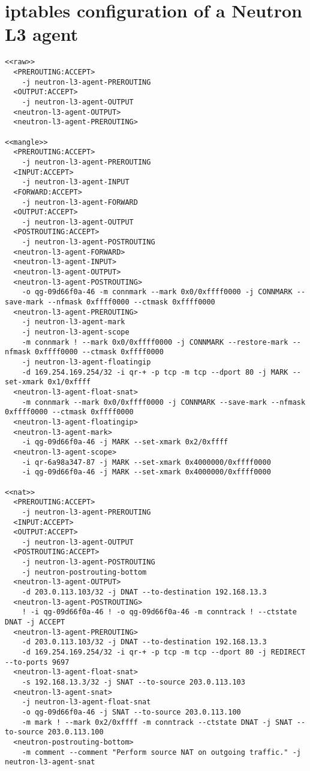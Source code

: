 \chapter{iptables configuration of a Neutron L3 agent}
\label{app:qrouter}

\begin{lstlisting}
<<raw>>
  <PREROUTING:ACCEPT>
    -j neutron-l3-agent-PREROUTING
  <OUTPUT:ACCEPT>
    -j neutron-l3-agent-OUTPUT
  <neutron-l3-agent-OUTPUT>
  <neutron-l3-agent-PREROUTING>

<<mangle>>
  <PREROUTING:ACCEPT>
    -j neutron-l3-agent-PREROUTING
  <INPUT:ACCEPT>
    -j neutron-l3-agent-INPUT
  <FORWARD:ACCEPT>
    -j neutron-l3-agent-FORWARD
  <OUTPUT:ACCEPT>
    -j neutron-l3-agent-OUTPUT
  <POSTROUTING:ACCEPT>
    -j neutron-l3-agent-POSTROUTING
  <neutron-l3-agent-FORWARD>
  <neutron-l3-agent-INPUT>
  <neutron-l3-agent-OUTPUT>
  <neutron-l3-agent-POSTROUTING>
    -o qg-09d66f0a-46 -m connmark --mark 0x0/0xffff0000 -j CONNMARK --save-mark --nfmask 0xffff0000 --ctmask 0xffff0000
  <neutron-l3-agent-PREROUTING>
    -j neutron-l3-agent-mark
    -j neutron-l3-agent-scope
    -m connmark ! --mark 0x0/0xffff0000 -j CONNMARK --restore-mark --nfmask 0xffff0000 --ctmask 0xffff0000
    -j neutron-l3-agent-floatingip
    -d 169.254.169.254/32 -i qr-+ -p tcp -m tcp --dport 80 -j MARK --set-xmark 0x1/0xffff
  <neutron-l3-agent-float-snat>
    -m connmark --mark 0x0/0xffff0000 -j CONNMARK --save-mark --nfmask 0xffff0000 --ctmask 0xffff0000
  <neutron-l3-agent-floatingip>
  <neutron-l3-agent-mark>
    -i qg-09d66f0a-46 -j MARK --set-xmark 0x2/0xffff
  <neutron-l3-agent-scope>
    -i qr-6a98a347-87 -j MARK --set-xmark 0x4000000/0xffff0000
    -i qg-09d66f0a-46 -j MARK --set-xmark 0x4000000/0xffff0000

<<nat>>
  <PREROUTING:ACCEPT>
    -j neutron-l3-agent-PREROUTING
  <INPUT:ACCEPT>
  <OUTPUT:ACCEPT>
    -j neutron-l3-agent-OUTPUT
  <POSTROUTING:ACCEPT>
    -j neutron-l3-agent-POSTROUTING
    -j neutron-postrouting-bottom
  <neutron-l3-agent-OUTPUT>
    -d 203.0.113.103/32 -j DNAT --to-destination 192.168.13.3
  <neutron-l3-agent-POSTROUTING>
    ! -i qg-09d66f0a-46 ! -o qg-09d66f0a-46 -m conntrack ! --ctstate DNAT -j ACCEPT
  <neutron-l3-agent-PREROUTING>
    -d 203.0.113.103/32 -j DNAT --to-destination 192.168.13.3
    -d 169.254.169.254/32 -i qr-+ -p tcp -m tcp --dport 80 -j REDIRECT --to-ports 9697
  <neutron-l3-agent-float-snat>
    -s 192.168.13.3/32 -j SNAT --to-source 203.0.113.103
  <neutron-l3-agent-snat>
    -j neutron-l3-agent-float-snat
    -o qg-09d66f0a-46 -j SNAT --to-source 203.0.113.100
    -m mark ! --mark 0x2/0xffff -m conntrack --ctstate DNAT -j SNAT --to-source 203.0.113.100
  <neutron-postrouting-bottom>
    -m comment --comment "Perform source NAT on outgoing traffic." -j neutron-l3-agent-snat


\end{lstlisting}
